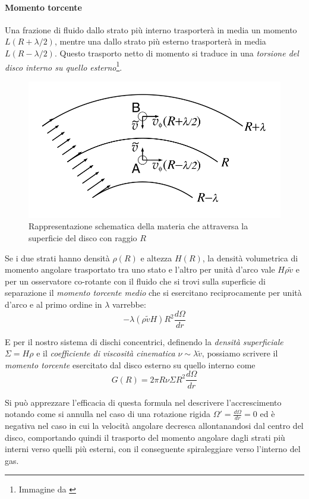 \documentclass[a4paperbi]{article}
\begin{document}
	\paragraph{Momento torcente}	

	Una frazione di fluido dallo strato più interno trasporterà in media un momento $L(R+\lambda/2)$, mentre una dallo strato più esterno trasporterà in media $L(R-\lambda/2)$. Questo trasporto netto di momento si traduce in una \textit{torsione del disco interno su quello esterno}\footnote{Immagine da \cite{FrankKingRaineAccretionPower}}.
	
	\begin{figure}[H]
		\centering
		\includegraphics[width=0.6\linewidth]{TraspoMateria}
		\caption{Rappresentazione schematica della materia che attraversa la superficie del disco con raggio $R$}
		\label{fig:TraspoMateria}
	\end{figure}
		
	Se i due strati hanno densità $\rho(R)$ e altezza $H(R)$, la densità volumetrica di momento angolare trasportato tra uno stato e l'altro per unità d'arco vale $H\rho\tilde{v}$ e per un osservatore co-rotante con il fluido che si trovi sulla superficie di separazione il \textit{momento torcente medio} che si esercitano reciprocamente per unità d'arco e al primo ordine in $\lambda$ varrebbe:
	\begin{equation*}
		-\lambda(\rho\tilde{v} H) R^2\frac{d\Omega}{dr}
	\end{equation*}

	E per il nostro sistema di dischi concentrici, definendo la \textit{densità superficiale} $\Sigma=H\rho$ e il \textit{coefficiente di viscosità cinematica} $\nu\sim\lambda\tilde{v}$, possiamo scrivere il \textit{momento torcente} esercitato dal disco esterno su quello interno come
	\begin{equation}
		G(R)=2\pi R\nu\Sigma R^2\frac{d\Omega}{dr}
	\end{equation}

	Si può apprezzare l'efficacia di questa formula nel descrivere l'accrescimento notando come si annulla nel caso di una rotazione rigida $\Omega'=\frac{d\Omega}{dr}=0$ ed è negativa nel caso in cui la velocità angolare decresca allontanandosi dal centro del disco, comportando quindi il trasporto del momento angolare dagli strati più interni verso quelli più esterni, con il conseguente spiraleggiare verso l'interno del gas.	
					
\end{document}
